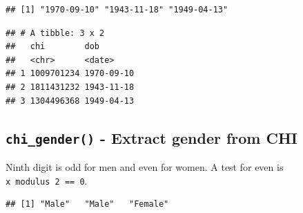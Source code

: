 \documentclass[]{book}
\newenvironment{Shaded}{\begin{snugshade}}{\end{snugshade}}
\newcommand{\CommentTok}[1]{\textcolor[rgb]{0.56,0.35,0.01}{\textit{#1}}}
\newcommand{\ControlFlowTok}[1]{\textcolor[rgb]{0.13,0.29,0.53}{\textbf{#1}}}
\newcommand{\DataTypeTok}[1]{\textcolor[rgb]{0.13,0.29,0.53}{#1}}
\newcommand{\DecValTok}[1]{\textcolor[rgb]{0.00,0.00,0.81}{#1}}
\newcommand{\KeywordTok}[1]{\textcolor[rgb]{0.13,0.29,0.53}{\textbf{#1}}}
\newcommand{\NormalTok}[1]{#1}
\newcommand{\OperatorTok}[1]{\textcolor[rgb]{0.81,0.36,0.00}{\textbf{#1}}}
\newcommand{\StringTok}[1]{\textcolor[rgb]{0.31,0.60,0.02}{#1}}
\begin{document}
\begin{verbatim}
## [1] "1970-09-10" "1943-11-18" "1949-04-13"
\end{verbatim}

\begin{Shaded}
\end{Shaded}

\begin{verbatim}
## # A tibble: 3 x 2
##   chi        dob       
##   <chr>      <date>    
## 1 1009701234 1970-09-10
## 2 1811431232 1943-11-18
## 3 1304496368 1949-04-13
\end{verbatim}

\hypertarget{chi_gender---extract-gender-from-chi}{%
\subsection{\texorpdfstring{\texttt{chi\_gender()} - Extract gender from CHI}{chi\_gender() - Extract gender from CHI}}\label{chi_gender---extract-gender-from-chi}}

Ninth digit is odd for men and even for women.
A test for even is \texttt{x\ modulus\ 2\ ==\ 0}.

\begin{Shaded}
\end{Shaded}

\begin{verbatim}
## [1] "Male"   "Male"   "Female"
\end{verbatim}
\end{document}
